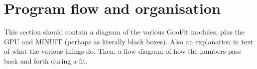 \section{Program flow and organisation}
\label{sec:flow}

This section should contain a diagram of the various GooFit modules,
plus the GPU and MINUIT (perhaps as literally black boxes). Also
an explanation in text of what the various things do. Then, a flow 
diagram of how the numbers pass back and forth during a fit. 

